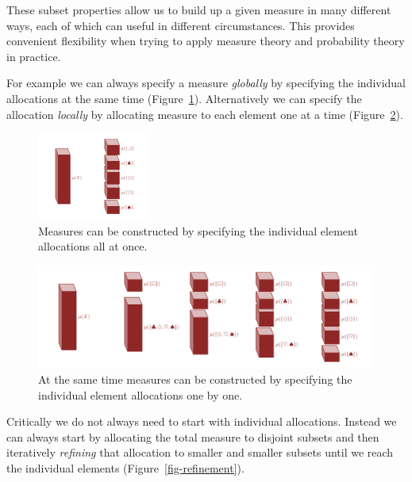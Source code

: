 \documentclass[
  letterpaper,
  DIV=11,
  numbers=noendperiod]{scrartcl}
\begin{document}
These subset properties allow us to build up a given measure in many
different ways, each of which can useful in different circumstances.
This provides convenient flexibility when trying to apply measure theory
and probability theory in practice.

For example we can always specify a measure \emph{globally} by
specifying the individual allocations at the same time
(Figure~\ref{fig-all_at_once}). Alternatively we can specify the
allocation \emph{locally} by allocating measure to each element one at a
time (Figure~\ref{fig-one_at_a_time}).

\begin{figure}

{\centering \includegraphics[width=0.33\textwidth,height=\textheight]{figures/decompositions/all_at_once/all_at_once.pdf}

}

\caption{\label{fig-all_at_once}Measures can be constructed by
specifying the individual element allocations all at once.}

\end{figure}

\begin{figure}

{\centering \includegraphics[width=1\textwidth,height=\textheight]{figures/decompositions/one_at_a_time/one_at_a_time.pdf}

}

\caption{\label{fig-one_at_a_time}At the same time measures can be
constructed by specifying the individual element allocations one by
one.}

\end{figure}

Critically we do not always need to start with individual allocations.
Instead we can always start by allocating the total measure to disjoint
subsets and then iteratively \emph{refining} that allocation to smaller
and smaller subsets until we reach the individual elements
(Figure~\ref{fig-refinement}).
\end{document}
